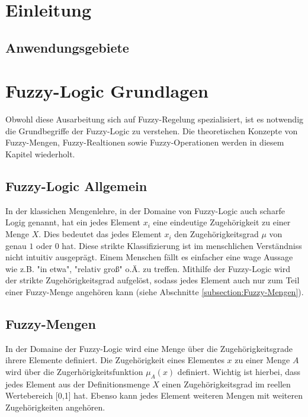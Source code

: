 \documentclass[12pt,a4paper,bibliography=totocnumbered,listof=totocnumbered]{scrartcl}
\begin{document}
\section{Einleitung}

\subsection{Anwendungsgebiete}

\section{Fuzzy-Logic Grundlagen}

Obwohl diese Ausarbeitung sich auf Fuzzy-Regelung spezialisiert, ist es notwendig die Grundbegriffe der Fuzzy-Logic zu verstehen. Die theoretischen Konzepte von Fuzzy-Mengen, Fuzzy-Realtionen sowie Fuzzy-Operationen werden in diesem Kapitel wiederholt.

\subsection{Fuzzy-Logic Allgemein}

In der klassichen Mengenlehre, in der Domaine von Fuzzy-Logic auch scharfe Logig genannt, hat ein jedes Element $x_i$ eine eindeutige Zugehörigkeit zu einer Menge $X$. Dies bedeutet das jedes Element $x_i$ den Zugehörigkeitsgrad $\mu$ von genau $1$ oder $0$ hat. Diese strikte Klassifizierung ist im menschlichen Verständniss nicht intuitiv ausgeprägt. Einem Menschen fällt es einfacher eine wage Aussage wie z.B. "in etwa", "relativ groß" o.Ä. zu treffen. Mithilfe der Fuzzy-Logic wird der strikte Zugehörigkeitsgrad aufgelöst, sodass jedes Element auch nur zum Teil einer Fuzzy-Menge angehören kann (siehe Abschnitte \ref{subsection:Fuzzy-Mengen}).

\label{subsection:Fuzzy-Mengen}
\subsection{Fuzzy-Mengen}

In der Domaine der Fuzzy-Logic wird eine Menge über die Zugehörigkeitsgrade ihrere Elemente definiert. Die Zugehörigkeit eines Elementes $x$ zu einer Menge $A$ wird über die Zugerhörigkeitsfunktion $\mu_A(x)$ definiert. Wichtig ist hierbei, dass jedes Element aus der Definitionsmenge $X$ einen Zugehörigkeitsgrad im reellen Wertebereich [0,1] hat. Ebenso kann jedes Element weiteren Mengen mit weiteren Zugehörigkeiten angehören.
\end{document}

